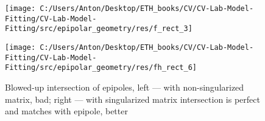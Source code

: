 \documentclass{report}
\begin{document}
\begin{figure}[h!]
	\begin{center}
		\begin{minipage}[h!]{0.49\linewidth}
			\texttt{[image: C:/Users/Anton/Desktop/ETH\_books/CV/CV-Lab-Model-Fitting/CV-Lab-Model-Fitting/src/epipolar\_geometry/res/f\_rect\_3]}
		\end{minipage}
		\hfill
		\begin{minipage}[h!]{0.49\linewidth}
			\texttt{[image: C:/Users/Anton/Desktop/ETH\_books/CV/CV-Lab-Model-Fitting/CV-Lab-Model-Fitting/src/epipolar\_geometry/res/fh\_rect\_6]}
		\end{minipage}
		
		\caption{Blowed-up intersection of epipoles, left --- with non-singularized matrix, bad; right --- with singularized matrix intersection is perfect and matches with epipole, better}
	\end{center}
\end{figure}
\end{document}

